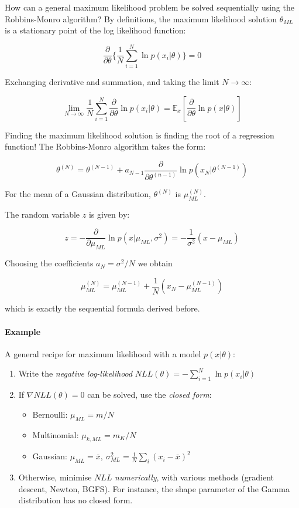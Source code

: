 \documentclass{article}
\begin{document}
How can a general maximum likelihood problem be solved sequentially
using the Robbins-Monro algorithm? By definitions, the maximum
likelihood solution \(\theta_{ML}\) is a stationary point of the log
likelihood function:

\[\frac{\partial }{\partial \theta}\{ \frac{1}{N} \sum_{i=1}^N \ln p(x_i |
\theta) \} = 0\]

Exchanging derivative and summation, and taking the limit
\(N \rightarrow \infty\):

\[\lim_{N \rightarrow \infty} \frac{1}{N} \sum_{i=1}^N \frac{\partial}{\partial
\theta} \ln p(x_i | \theta ) = \mathbb{E}_x[\frac{\partial}{\partial \theta} \ln
p(x|\theta )]\]

Finding the maximum likelihood solution is finding the root of a
regression function! The Robbins-Monro algorithm takes the form:

\[\theta^{(N)} = \theta^{(N-1)} + a_{N-1} \frac{\partial}{\partial \theta^{(n-1)}} \ln p(x_N | \theta^{(N-1)})\]

For the mean of a Gaussian distribution, \(\theta^{(N)}\) is
\(\mu_{ML}^{(N)}\).

The random variable \(z\) is given by:

\[z = - \frac{\partial}{\partial \mu_{ML}} \ln p(x | \mu_{ML}, \sigma^2) =
-\frac{1}{\sigma^2} (x - \mu_{ML})\]

Choosing the coefficients \(a_N = \sigma^2 / N\) we obtain

\[\mu_{ML}^{(N)} = \mu_{ML}^{(N-1)} + \frac{1}{N} (x_N - \mu_{ML}^{(N-1)})\]

which is exactly the sequential formula derived before.

\paragraph{Example}\label{example}

A general recipe for maximum likelihood with a model \(p(x|\theta )\):

\begin{enumerate}
\def\labelenumi{\arabic{enumi}.}
\item
  Write the \emph{negative log-likelihood}
  \(NLL(\theta) = -\sum_{i=1}^N \ln p(x_i|
  \theta )\)
\item
  If \(\nabla NLL(\theta ) = 0\) can be solved, use the \emph{closed
  form}:

  \begin{itemize}
  \tightlist
  \item
    Bernoulli: \(\mu_{ML} = m/N\)
  \item
    Multinomial: \(\mu_{k, ML} = m_K/N\)
  \item
    Gaussian:
    \(\mu_{ML} = \bar{x},\ \sigma_{ML}^2 = \frac{1}{N} \sum_i (x_i -
    \bar{x})^2\)
  \end{itemize}
\item
  Otherwise, minimise \(NLL\) \emph{numerically}, with various methods
  (gradient descent, Newton, BGFS). For instance, the shape parameter of
  the Gamma distribution has no closed form.
\end{enumerate}
\end{document}
